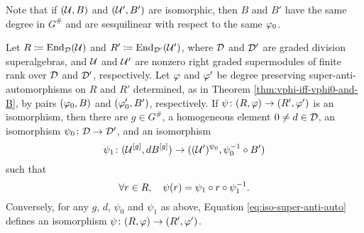 Note that if $(\mathcal U, B)$ and $(\mathcal U', B')$ are isomorphic, then $B$ and $B'$ have the same degree in $G^\#$ and are sesquilinear with respect to the same $\varphi_0$. 


\begin{thm}\label{thm:iso-abstract-vphi}
    Let $R \coloneqq \operatorname{End}_{\mathcal{D}}(\mathcal U)$ and $R' \coloneqq \operatorname{End}_{\mathcal{D}'}(\mathcal U')$, where $\mathcal{D}$ and $\mathcal{D}'$ are graded division superalgebras, and $\mathcal U$ and $\mathcal U'$ are nonzero right graded supermodules of finite rank over $\mathcal{D}$ and $\mathcal{D}'$, respectively. 
    Let $\varphi$ and $\varphi'$ be degree preserving super-anti-automorphisms on $R$ and $R'$ determined, as in Theorem \ref{thm:vphi-iff-vphi0-and-B}, by pairs $(\varphi_0, B)$ and $(\varphi_0', B')$, respectively. 
    If $\psi\colon (R, \varphi) \to (R', \varphi')$ is an isomorphism, then there are $g\in G^\#$, a homogeneous element $0\neq d\in \mathcal{D}$, an isomorphism $\psi_0\colon \mathcal{D} \to \mathcal{D}'$, and an isomorphism
    \begin{equation}\label{eq:iso-B-implies-vphi}
        \psi_1 \colon (\mathcal U^{[g]}, dB^{[g]}) \to ( (\mathcal U')^{\psi_0}, \psi_0^{-1} \circ B' ) 
    \end{equation}
    such that 
    \begin{equation}\label{eq:iso-super-anti-auto}
        \forall r\in R, \quad \psi(r) = \psi_1 \circ r \circ \psi_1^{-1}.
    \end{equation}
    Conversely, for any $g$, $d$, $\psi_0$ and $\psi_1$ as above, 
    Equation \eqref{eq:iso-super-anti-auto}
    defines an isomorphism $\psi \colon (R, \varphi) \to (R', \varphi')$.
\end{thm}

